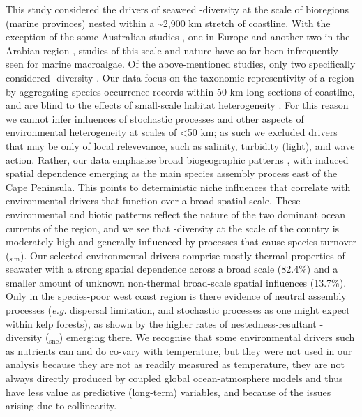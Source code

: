 \documentclass[utf8]{frontiersSCNS} %
\begin{document}
This study considered the drivers of seaweed \textbeta-diversity at the scale of bioregions (marine provinces) nested within a \textasciitilde{}2,900 km stretch of coastline. With the exception of the some Australian studies \citep{Smale2010,Smale2011,Waters2010,Leaper2011,Wernberg2013}, one in Europe \citep{Tuya2012} and another two in the Arabian region \citep{Schils2006,Issa2014}, studies of this scale and nature have so far been infrequently seen for marine macroalgae. Of the above-mentioned studies, only two specifically considered \textbeta-diversity \citep{Leaper2011,Issa2014}. Our data focus on the taxonomic representivity of a region by aggregating species occurrence records within 50 km long sections of coastline, and are blind to the effects of small-scale habitat heterogeneity \citep[\emph{e.g.} as seen in][]{Smale2010}. For this reason we cannot infer influences of stochastic processes and other aspects of environmental heterogeneity at scales of \textless{}50 km; as such we excluded drivers that may be only of local relevevance, such as salinity, turbidity (light), and wave action. Rather, our data emphasise broad biogeographic patterns \citep{Lawton1999}, with induced spatial dependence \citep{PeresNeto2010} emerging as the main species assembly process east of the Cape Peninsula. This points to deterministic niche influences that correlate with environmental drivers that function over a broad spatial scale. These environmental and biotic patterns reflect the nature of the two dominant ocean currents of the region, and we see that \textbeta-diversity at the scale of the country is moderately high and generally influenced by processes that cause species turnover (\textbeta$_{\text{sim}}$). Our selected environmental drivers comprise mostly thermal properties of seawater with a strong spatial dependence across a broad scale (82.4\%) and a smaller amount of unknown non-thermal broad-scale spatial influences (13.7\%). Only in the species-poor west coast region is there evidence of neutral assembly processes (\emph{e.g.} dispersal limitation, and stochastic processes as one might expect within kelp forests), as shown by the higher rates of nestedness-resultant \textbeta-diversity (\textbeta$_{\text{sne}}$) emerging there. We recognise that some environmental drivers such as nutrients can and do co-vary with temperature, but they were not used in our analysis because they are not as readily measured as temperature, they are not always directly produced by coupled global ocean-atmosphere models and thus have less value as predictive (long-term) variables, and because of the issues arising due to collinearity.
\end{document}
